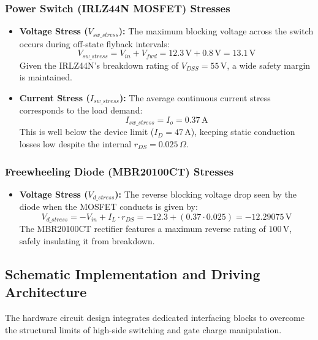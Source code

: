 \subsubsection{Power Switch (IRLZ44N MOSFET) Stresses}
\begin{itemize}
    \item \textbf{Voltage Stress ($V_{sw\_stress}$):} The maximum blocking voltage across the switch occurs during off-state flyback intervals:
    \begin{equation}
    V_{sw\_stress} = V_{in} + V_{fwd} = 12.3\,\text{V} + 0.8\,\text{V} = 13.1\,\text{V}
    \end{equation}
    Given the IRLZ44N's breakdown rating of $V_{DSS} = 55\,\text{V}$, a wide safety margin is maintained.
    \item \textbf{Current Stress ($I_{sw\_stress}$):} The average continuous current stress corresponds to the load demand:
    \begin{equation}
    I_{sw\_stress} = I_o = 0.37\,\text{A}
    \end{equation}
    This is well below the device limit ($I_D = 47\,\text{A}$), keeping static conduction losses low despite the internal $r_{DS} = 0.025\,\Omega$.
\end{itemize}

\subsubsection{Freewheeling Diode (MBR20100CT) Stresses}
\begin{itemize}
    \item \textbf{Voltage Stress ($V_{d\_stress}$):} The reverse blocking voltage drop seen by the diode when the MOSFET conducts is given by:
    \begin{equation}
    V_{d\_stress} = -V_{in} + I_L \cdot r_{DS} = -12.3 + (0.37 \cdot 0.025) = -12.29075\,\text{V}
    \end{equation}
    The MBR20100CT rectifier features a maximum reverse rating of $100\,\text{V}$, safely insulating it from breakdown.
\end{itemize}

\subsection{Schematic Implementation and Driving Architecture}
The hardware circuit design integrates dedicated interfacing blocks to overcome the structural limits of high-side switching and gate charge manipulation.

